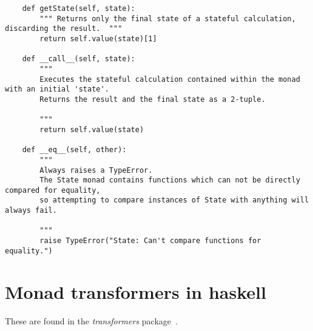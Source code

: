 \begin{lstlisting}
	def getState(self, state):
		""" Returns only the final state of a stateful calculation, discarding the result.  """
		return self.value(state)[1]

	def __call__(self, state):
		"""
		Executes the stateful calculation contained within the monad with an initial 'state'.
		Returns the result and the final state as a 2-tuple.

		"""
		return self.value(state)

	def __eq__(self, other):
		"""
		Always raises a TypeError.
		The State monad contains functions which can not be directly compared for equality,
		so attempting to compare instances of State with anything will always fail.

		"""
		raise TypeError("State: Can't compare functions for equality.")
\end{lstlisting}


\chapter{Monad transformers in haskell}\label{app:monadshaskell}
These are found in the \emph{transformers} package~\cite{haskelllibrary}.

